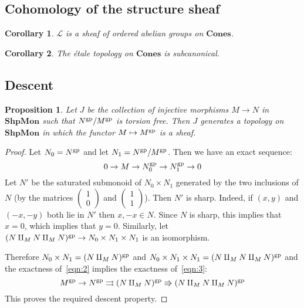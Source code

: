 \documentclass[12pt]{amsart}
\theoremstyle{plan}
\newtheorem{proposition}[theorem]{Proposition}
\newtheorem{corollary}{Corollary}
\numberwithin{lemma}{theorem}
\numberwithin{corollary}{theorem}
\theoremstyle{definition}
\theoremstyle{remark}
\def\ShpMon{\mathbf{ShpMon}}
\def\Cones{\mathbf{Cones}}
\def\rrarrow{\rightrightarrows}
\def\rrrarrow{\Rrightarrow}
\begin{document}
\subsection{Cohomology of the structure sheaf}

\begin{corollary}
$\mathscr L$ is a sheaf of ordered abelian groups on $\Cones$.
\end{corollary}

\begin{corollary}
The \'etale topology on $\Cones$ is subcanonical.
\end{corollary}

\subsection{Descent}

\begin{proposition}
Let $J$ be the collection of injective morphisms $M \to N$ in $\ShpMon$ such that $N^{\rm gp} / M^{\rm gp}$ is torsion free.  Then $J$ generates a topology on $\ShpMon$ in which the functor $M \mapsto M^{\rm gp}$ is a sheaf.
\end{proposition}
\begin{proof}
Let $N_0 = N^{\rm gp}$ and let $N_1 = N^{\rm gp} / M^{\rm gp}$.  Then we have an exact sequence:
\begin{equation} \label{eqn:2}
0 \to M \to N_0^{\rm gp} \to N_1^{\rm gp} \to 0
\end{equation}
Let $N'$ be the saturated submonoid of $N_0 \times N_1$ generated by the two inclusions of $N$ (by the matrices $\begin{pmatrix} 1 \\ 0 \end{pmatrix}$ and $\begin{pmatrix} 1 \\ 1 \end{pmatrix}$).  Then $N'$ is sharp.  Indeed, if $(x,y)$ and $(-x,-y)$ both lie in $N'$ then $x, -x \in N$.  Since $N$ is sharp, this implies that $x = 0$, which implies that $y = 0$.  Similarly, let $(N \amalg_M N \amalg_M N)^{\rm gp} \to N_0 \times N_1 \times N_1$ is an isomorphism.

Therefore $N_0 \times N_1 = (N \amalg_M N)^{\rm gp}$ and $N_0 \times N_1 \times N_1 = (N \amalg_M N \amalg_M N)^{\rm gp}$ and the exactness of~\eqref{eqn:2} implies the exactness of~\eqref{eqn:3}:
\begin{equation} \label{eqn:3}
M^{\rm gp} \to N^{\rm gp} \rrarrow (N \amalg_M N)^{\rm gp} \rrrarrow (N \amalg_M N \amalg_M N)^{\rm gp}
\end{equation}
This proves the required descent property.
\end{proof}
\end{document}

